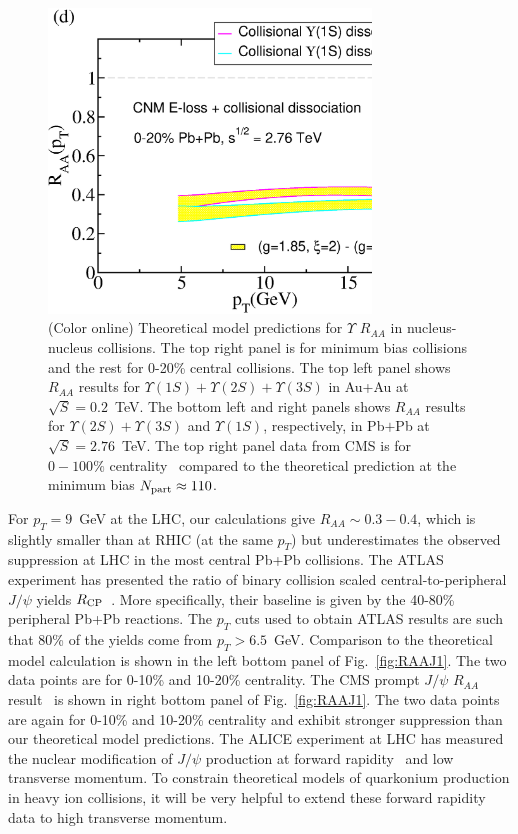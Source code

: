 \documentclass[article,showpacs,preprintnumbers,amsmath,amssymb]{revtex4}
\begin{document}
\begin{figure}[!t]
\includegraphics[width=3.38in,angle=0]{fig15_lhc2760pbpbupsilon.eps}
\caption{(Color online) Theoretical model predictions for $\Upsilon$ $R_{AA}$
in nucleus-nucleus collisions.  The top right panel is for minimum bias collisions
and the rest for 0-20\% central collisions. The top left panel shows
$R_{AA}$ results for   $\Upsilon(1S)+\Upsilon(2S)+\Upsilon(3S)$ in Au+Au at
$\sqrt{S}=0.2$~TeV.  The bottom left and right panels shows $R_{AA}$ results
for   $\Upsilon(2S)+\Upsilon(3S)$ and  $\Upsilon(1S)$, respectively, in
Pb$+$Pb  at $\sqrt{S}=2.76$~TeV. The top right panel data from CMS is for
$0-100\%$ centrality~\cite{Chatrchyan:2012np} compared to the theoretical
prediction at the minimum bias $N_{\rm part} \approx 110$.
~\label{fig:RAAU}}
\end{figure}



For $p_T=9$~GeV at the LHC, our calculations give $R_{AA}\sim 0.3-0.4$, 
which is slightly smaller than at RHIC (at the same $ p_T$) but underestimates the 
observed suppression at  LHC in the most central Pb+Pb collisions.  
The ATLAS experiment has presented the ratio of binary collision scaled 
central-to-peripheral $J/\psi$  yields $R_{\rm CP}$~\cite{:2010px}. More 
specifically, their baseline is given by the 40-80\% peripheral Pb+Pb reactions.
The $p_T$ cuts used to obtain ATLAS results are such that 
$80$\% of the yields come from $p_T>6.5$~GeV. Comparison to the theoretical
model calculation is shown in the left bottom panel of  Fig.~\ref{fig:RAAJ1}.
The two data points are for 0-10\% and 10-20\% centrality. 
The CMS prompt $J/\psi$ $R_{AA}$ result~\cite{Chatrchyan:2012np} is  
shown in right bottom  panel of Fig.~\ref{fig:RAAJ1}. The two data points are
again for 0-10\% and 10-20\% centrality and   
exhibit stronger suppression than our theoretical model predictions. 
The ALICE experiment at LHC has  measured the nuclear modification of 
$J/\psi$ production at forward rapidity~\cite{Abelev:2012rv} and low transverse
momentum. To constrain theoretical models of quarkonium production in heavy
ion collisions, it will be very helpful to extend these forward rapidity 
data to high transverse momentum.   
\end{document}
